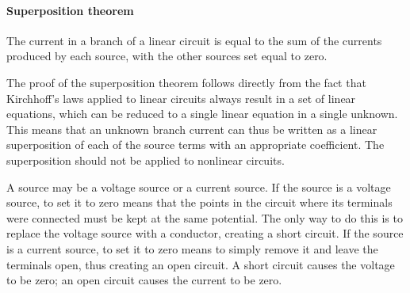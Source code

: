 \documentclass[../../document]{subfiles}
\begin{document}
\paragraph*{Superposition theorem}
The current in a branch of a linear circuit is equal to the sum of the currents
produced by each source, with the other sources set equal to zero.
\cite{practical_electronics}

The proof of the superposition theorem follows directly from the fact that
Kirchhoff’s laws applied to linear circuits always result in a set of linear
equations, which can be reduced to a single linear equation in a single
unknown. This means that an unknown branch current can thus be written as a
linear superposition of each of the source terms with an appropriate
coefficient. The superposition should not be applied to nonlinear circuits.
\cite{practical_electronics}

A source may be a voltage source or a current source. If the source is a
voltage source, to set it to zero means that the points in the circuit where
its terminals were connected must be kept at the same potential. The only way
to do this is to replace the voltage source with a conductor, creating a short
circuit. If the source is a current source, to set it to zero means to simply
remove it and leave the terminals open, thus creating an open circuit. A short
circuit causes the voltage to be zero; an open circuit causes the current to be
zero. \cite{practical_electronics}
\end{document}
